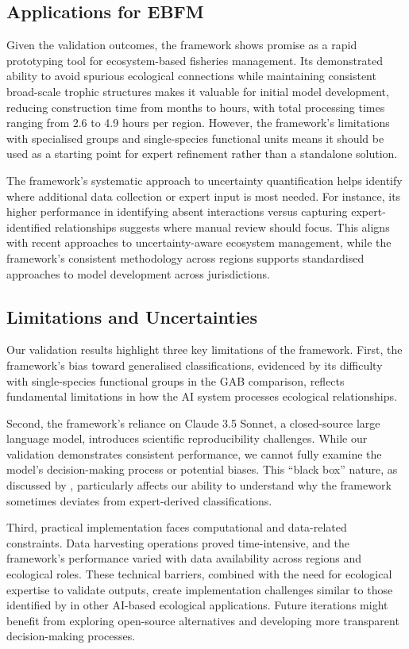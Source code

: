 \subsection{Applications for EBFM}

Given the validation outcomes, the framework shows promise as a rapid prototyping tool for ecosystem-based fisheries management. Its demonstrated ability to avoid spurious ecological connections while maintaining consistent broad-scale trophic structures makes it valuable for initial model development, reducing construction time from months to hours, with total processing times ranging from 2.6 to 4.9 hours per region. However, the framework's limitations with specialised groups and single-species functional units means it should be used as a starting point for expert refinement rather than a standalone solution.

The framework's systematic approach to uncertainty quantification helps identify where additional data collection or expert input is most needed. For instance, its higher performance in identifying absent interactions versus capturing expert-identified relationships suggests where manual review should focus. This aligns with recent approaches to uncertainty-aware ecosystem management, while the framework's consistent methodology across regions supports standardised approaches to model development across jurisdictions.

\subsection{Limitations and Uncertainties}

Our validation results highlight three key limitations of the framework. First, the framework's bias toward generalised classifications, evidenced by its difficulty with single-species functional groups in the GAB comparison, reflects fundamental limitations in how the AI system processes ecological relationships. 

Second, the framework's reliance on Claude 3.5 Sonnet, a closed-source large language model, introduces scientific reproducibility challenges. While our validation demonstrates consistent performance, we cannot fully examine the model's decision-making process or potential biases. This ``black box'' nature, as discussed by \cite{Fernandes2024}, particularly affects our ability to understand why the framework sometimes deviates from expert-derived classifications.

Third, practical implementation faces computational and data-related constraints. Data harvesting operations proved time-intensive, and the framework's performance varied with data availability across regions and ecological roles. These technical barriers, combined with the need for ecological expertise to validate outputs, create implementation challenges similar to those identified by \cite{Fernandes2024} in other AI-based ecological applications. Future iterations might benefit from exploring open-source alternatives \citep{Kommineni2024} and developing more transparent decision-making processes.

